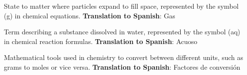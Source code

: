 \begin{vocabulary}[Gas]
      State to matter where particles expand to fill space, represented by the symbol (g) in chemical equations. \newline
       \textbf{Translation to Spanish}: Gas \newline
\end{vocabulary}

\begin{vocabulary}[Aqueous]
      Term describing a substance dissolved in water, represented by the symbol (aq) in chemical reaction formulas. \newline
       \textbf{Translation to Spanish}: Acuoso \newline
\end{vocabulary}

\begin{vocabulary}
      Mathematical tools used in chemistry to convert between different units, such as grams to moles or vice versa. \newline
       \textbf{Translation to Spanish}: Factores de conversión \newline
\end{vocabulary}
